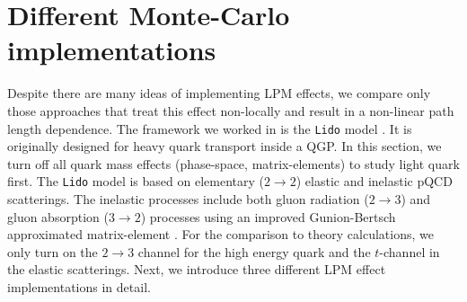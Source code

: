 \documentclass[aps, prc, reprint, amsmath, groupedaddress, nofootinbib]{revtex4-1}
\begin{document}
\section{Different Monte-Carlo implementations}\label{section:MC}
Despite there are many ideas of implementing LPM effects,
we compare only those approaches that treat this effect non-locally and result in a non-linear path length dependence.
The framework we worked in is the {\tt Lido} model \cite{Ke:2018tsh}. 
It is originally designed for heavy quark transport inside a QGP. 
In this section, we turn off all quark mass effects (phase-space, matrix-elements) to study light quark first.
The {\tt Lido} model is based on elementary ($2\rightarrow2$) elastic and inelastic pQCD scatterings. 
The inelastic processes include both gluon radiation ($2\rightarrow 3$) and gluon absorption ($3\rightarrow 2$) processes using an improved Gunion-Bertsch approximated matrix-element \cite{Fochler:2013epa,Uphoff:2014hza}.
For the comparison to theory calculations, we only turn on the $2\rightarrow 3$ channel for the high energy quark and the $t$-channel in the elastic scatterings.
Next, we introduce three different LPM effect implementations in detail.
\end{document}
